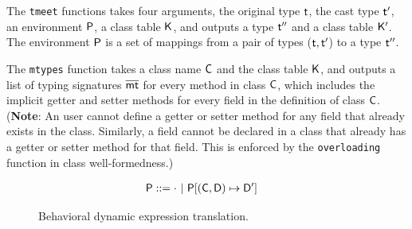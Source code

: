 \documentclass[a4paper,USenglish]{tex/lipics-v2016}
\begin{document}
% 

The \texttt{tmeet} functions takes four arguments, the original type
$\t$, the cast type $\tp$, an environment $\P$, a class table $\K$, and
outputs a type $\tpp$ and a class table $\Kp$. The environment $\P$ is a set
of mappings from a pair of types ($\t,\tp$) to a type $\tpp$.

The \texttt{mtypes} function takes a class name $\C$ and the class table
$\K$, and outputs a list of typing signatures $\b\mt$ for every method in
class $\C$, which includes the implicit getter and setter methods for every
field in the definition of class $\C$.  (\textbf{Note}: An user cannot
define a getter or setter method for any field that already exists in the
class. Similarly, a field cannot be declared in a class that already has a
getter or setter method for that field. This is enforced by the
\texttt{overloading} function in class well-formedness.)

\begin{figure}[!ht]
\hrulefill

\opdef{
  $\tmeet{\t}{\tp}\P\K = \tpp\,\Kp$
}{
}
\begin{align*}
\P &::= \cdot \B \Map\P{\Bind{(\C,\D)}\Dp}
\end{align*}
\begin{mathpar}




\end{mathpar}

\vspace{-2mm}
\hrulefill
\caption{Behavioral dynamic expression translation.}\label{monmeet}
\end{figure}
\end{document}
